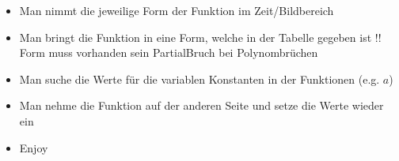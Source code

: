 \documentclass[letterpaper,10pt,english]{jupyterBook}
\begin{document}
\begin{DUlineblock}{0em}
\item[] 
\end{DUlineblock}
\begin{itemize}
\item {} 
\sphinxAtStartPar
Man nimmt die jeweilige Form der Funktion im Zeit/Bildbereich

\item {} 
\sphinxAtStartPar
Man bringt die Funktion in eine Form, welche in der Tabelle gegeben ist
!! Form muss vorhanden sein
Partial\sphinxhyphen{}Bruch bei Polynombrüchen

\item {} 
\sphinxAtStartPar
Man suche die Werte für die variablen Konstanten in der Funktionen (e.g. \(a\))

\item {} 
\sphinxAtStartPar
Man nehme die Funktion auf der anderen Seite und setze die Werte wieder ein

\end{itemize}
\begin{itemize}
\item {} 
\sphinxAtStartPar
Enjoy

\end{itemize}

\sphinxAtStartPar
{}

\begin{DUlineblock}{0em}
\item[] 
\end{DUlineblock}

\begin{DUlineblock}{0em}
\item[] 
\end{DUlineblock}
\end{document}
